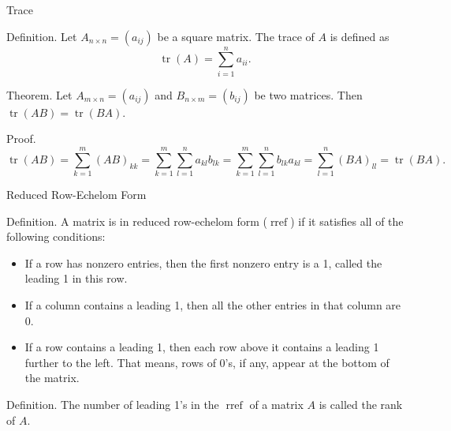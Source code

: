 \documentclass[11pt,aspectratio=169]{beamer}
\begin{document}
    \begin{frame}[t]{Trace}
        \par \textcolor{yy}{Definition.} Let $A_{n\times n} = (a_{ij})$ be a square matrix. The \textcolor{yy}{trace} of $A$ is defined as 
        \begin{equation*}
            \operatorname{tr}(A) = \sum\limits_{i=1}^{n} a_{ii}.
        \end{equation*}
        
        \phantom{yy}

        \par \textcolor{yy}{Theorem.} Let $A_{m \times n} = (a_{ij})$ and $B_{n \times m} = (b_{ij})$ be two matrices. Then $\operatorname{tr}(AB) = \operatorname{tr}(BA)$. 
        \pause 
        \par \textcolor{yy}{Proof.} 
        \begin{equation*}
            \operatorname{tr}(AB) = \sum\limits_{k=1}^{m} (AB)_{kk} = \sum\limits_{k=1}^{m} \sum\limits_{l=1}^{n} a_{kl} b_{lk} = \sum\limits_{k=1}^{m} \sum\limits_{l=1}^{n} b_{lk} a_{kl} = \sum\limits_{l=1}^{n} (BA)_{ll} = \operatorname{tr}(BA). 
        \end{equation*}
    \end{frame}

    \begin{frame}[t]{Reduced Row-Echelom Form}
        \par \textcolor{yy}{Definition.} A matrix is in \textcolor{yy}{reduced row-echelom form} ($\operatorname{rref}$) if it satisfies all of the following conditions: 
        \begin{itemize}
            \item If a row has nonzero entries, then the first nonzero entry is a 1, called the \textcolor{yy}{leading 1} in this row. 
            \item If a column contains a leading 1, then all the other entries in that column are 0. 
            \item If a row contains a leading 1, then each row above it contains a leading 1 further to the left. That means, rows of 0's, if any, appear at the bottom of the matrix. 
        \end{itemize}

        \phantom{yy}

        \par \textcolor{yy}{Definition.} The number of leading 1's in the  $\operatorname{rref}$ of a matrix $A$ is called the \textcolor{yy}{rank} of $A$.
    \end{frame}
\end{document}
